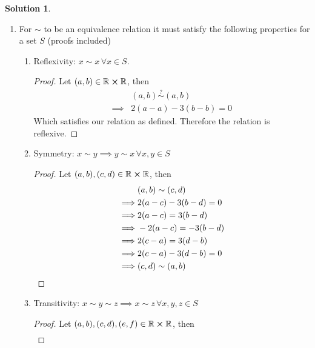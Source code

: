 \documentclass[10pt]{article}
\theoremstyle{definition}
\newtheorem{soln}{Solution}
\begin{document}
\begin{soln}~
  \begin{enumerate}[label=(\alph*)]
    \item For $\sim$ to be an equivalence relation it must satisfy the following properties for a set $S$ (proofs included)
          \begin{enumerate}[label=(\roman*)]
            \item Reflexivity: $x\sim x\,\forall x\in S$.
                  \begin{proof}
                    Let $(a,b)\in\mathbb{R}\cross\mathbb{R}$, then
                    \begin{align*}
                               & (a,b)\stackrel{?}{\sim}(a,b) \\
                      \implies & 2(a-a)-3(b-b) = 0
                    \end{align*}
                    Which satisfies our relation as defined. Therefore the relation is reflexive. \qedhere
                  \end{proof}
            \item Symmetry: $x\sim y\implies  y\sim x\,\forall x,y\in S$
                  \begin{proof}
                    Let $(a,b), (c,d)\in\mathbb{R}\cross\mathbb{R}$, then
                    \begin{align*}
                               & (a,b)\sim(c,d)          \\
                      \implies & 2(a-c)-3(b-d) = 0       \\
                      \implies & 2(a-c) = 3(b-d)         \\
                      \implies & -2(a-c) = -3(b-d)       \\
                      \implies & 2(c-a) = 3(d-b)         \\
                      \implies & 2(c-a)-3(d-b) =0        \\
                      \implies & (c,d)\sim(a,b) \qedhere
                    \end{align*}
                  \end{proof}
                  \newpage
            \item Transitivity: $x\sim y\sim z\implies  x\sim z\,\forall x,y,z\in S$
                  \begin{proof}
                    Let $(a,b), (c,d), (e,f)\in\mathbb{R}\cross\mathbb{R}$, then
                    \begin{align*}

\end{align*}
\end{proof}
\end{enumerate}
\end{enumerate}
\end{soln}
\end{document}
